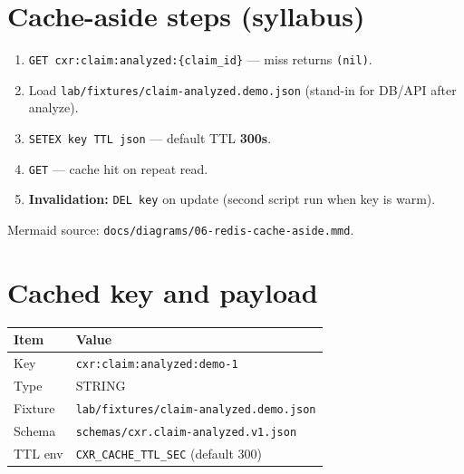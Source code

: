 \documentclass[11pt,a4paper]{report}
\begin{document}
\begin{center}
\end{center}

\section{Cache-aside steps (syllabus)}

\begin{enumerate}
  \item \texttt{GET cxr:claim:analyzed:\{claim\_id\}} --- miss returns \texttt{(nil)}.
  \item Load \texttt{lab/fixtures/claim-analyzed.demo.json} (stand-in for DB/API after analyze).
  \item \texttt{SETEX key TTL json} --- default TTL \textbf{300s}.
  \item \texttt{GET} --- cache hit on repeat read.
  \item \textbf{Invalidation:} \texttt{DEL key} on update (second script run when key is warm).
\end{enumerate}

Mermaid source: \texttt{docs/diagrams/06-redis-cache-aside.mmd}.

\section{Cached key and payload}

\begin{center}
\begin{tabular}{ll}
\toprule
Item & Value \\
\midrule
Key & \texttt{cxr:claim:analyzed:demo-1} \\
Type & STRING \\
Fixture & \texttt{lab/fixtures/claim-analyzed.demo.json} \\
Schema & \texttt{schemas/cxr.claim-analyzed.v1.json} \\
TTL env & \texttt{CXR\_CACHE\_TTL\_SEC} (default 300) \\
\bottomrule
\end{tabular}
\end{center}
\end{document}
